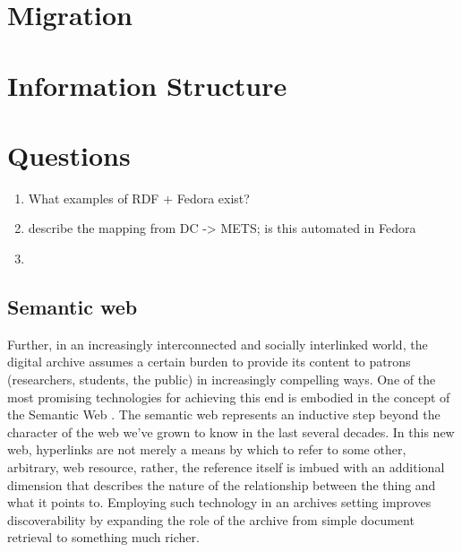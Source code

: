\documentclass[oneside]{article}
\begin{document}
\section{Migration}


\section{Information Structure}


\section{Questions}
\begin{enumerate}
  \item{What examples of RDF + Fedora exist?}
  \item{describe the mapping from DC -> METS; is this automated in Fedora}
  \item{}
\end{enumerate}

\subsection{Semantic web}
Further, in an increasingly interconnected and socially interlinked world, the digital archive assumes a certain burden to provide its content to patrons (researchers, students, the public) in increasingly compelling ways. One of the most promising technologies for achieving this end is embodied in the concept of the Semantic Web \needcite[TBL]. The semantic web represents an inductive step beyond the character of the web we've grown to know in the last several decades. In this new web, hyperlinks are not merely a means by which to refer to some other, arbitrary, web resource, rather, the reference itself is imbued with an additional dimension that describes the nature of the relationship between the thing and what it points to. \needcite[Barthes?] Employing such technology in an archives setting improves discoverability by expanding the role of the archive from simple document retrieval to something much richer.


\end{document}
